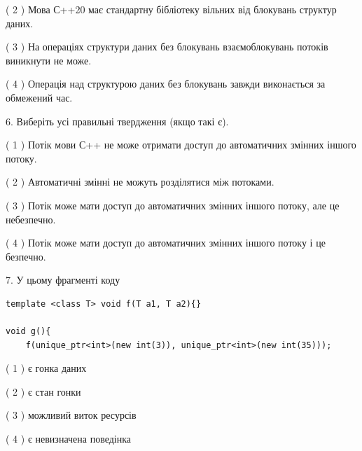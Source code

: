 \documentclass[12pt, ukrainian]{article}
\begin{document}
\begin {large}
{( 2 ) Мова С++20 має стандартну бібліотеку вільних від блокувань структур даних.%

( 3 ) На операціях структури даних без блокувань взаємоблокувань потоків виникнути не може.%

( 4 ) Операція над структурою даних без блокувань завжди виконається за обмежений час.%
\newpage



\vspace{5mm}
6. Виберіть усі правильні твердження (якщо такі є).\par
\vspace{2mm}

( 1 ) Потік мови С++ не може отримати доступ до автоматичних змінних іншого потоку.%

( 2 ) Автоматичні змінні не можуть розділятися між потоками.%

( 3 ) Потік може мати доступ до автоматичних змінних іншого потоку, але це небезпечно.%

( 4 ) Потік може мати доступ до автоматичних змінних іншого потоку і це безпечно.%


\vspace{5mm}
7. У цьому фрагменті коду
\begin{verbatim}
template <class T> void f(T a1, T a2){}

void g(){
    f(unique_ptr<int>(new int(3)), unique_ptr<int>(new int(35)));
\end{verbatim}

( 1 ) є гонка даних%

( 2 ) є стан гонки%

( 3 ) можливий виток ресурсів%

( 4 ) є невизначена поведінка%
}
\end {large}
\end{document}
